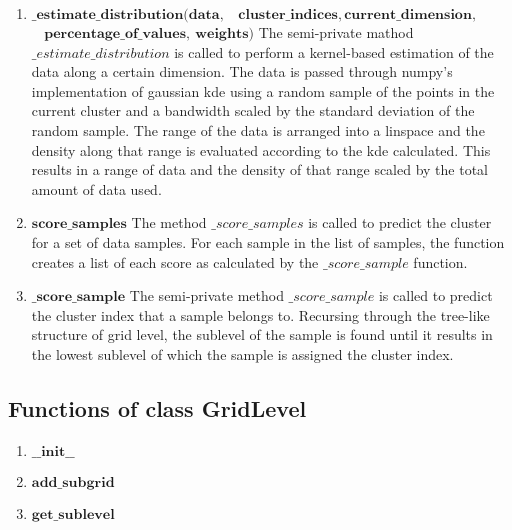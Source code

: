 \begin{enumerate}
{    If the previous and next values are both less than that of the current value, then the current index is added to the list of peaks.}
    \item $\mathbf{\_estimate\_distribution( data, }$\newline $\mathbf{~~~~ cluster\_indices, current\_dimension,}$\newline $\mathbf{~~~~  percentage\_of\_values,~weights )}$\newline
    {The semi-private mathod $\_estimate\_distribution$ is called to perform a kernel-based estimation of the data along a certain dimension.
    The data is passed through numpy's implementation of gaussian kde using a random sample of the points in the current cluster and a bandwidth scaled by the standard deviation of the random sample.
    The range of the data is arranged into a linspace and the density along that range is evaluated according to the kde calculated.
    This results in a range of data and the density of that range scaled by the total amount of data used.}
    \item $\mathbf{score\_samples}$\newline
    {The method $\_score\_samples$ is called to predict the cluster for a set of data samples.
    For each sample in the list of samples, the function creates a list of each score as calculated by the $\_score\_sample$ function.}
    \item $\mathbf{\_score\_sample}$\newline
    {The semi-private method $\_score\_sample$ is called to predict the cluster index that a sample belongs to.
    Recursing through the tree-like structure of grid level, the sublevel of the sample is found until it results in the lowest sublevel of which the sample is assigned the cluster index.}
\end{enumerate}

\subsection{Functions of class GridLevel}
\begin{enumerate}    
    \item $\mathbf{\_\_init\_\_}$\newline
    {}
    \item $\mathbf{add\_subgrid}$\newline
    {}
    \item $\mathbf{get\_sublevel}$\newline
    {}
\end{enumerate}



